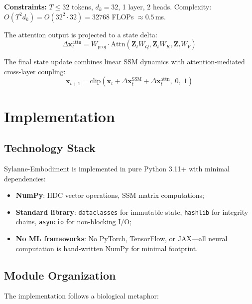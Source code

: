 \documentclass[10pt,twocolumn]{article}
\begin{document}
\textbf{Constraints:} $T \leq 32$ tokens, $d_k = 32$, 1 layer, 2 heads. Complexity: $O(T^2 d_k) = O(32^2 \cdot 32) = 32768$ FLOPs $\approx 0.5$\,ms.

The attention output is projected to a state delta:
\begin{equation}
\Delta \mathbf{x}_t^{\text{attn}} = W_{\text{proj}} \cdot \text{Attn}(\mathbf{Z}_t W_Q, \mathbf{Z}_t W_K, \mathbf{Z}_t W_V)
\end{equation}

The final state update combines linear SSM dynamics with attention-mediated cross-layer coupling:
\begin{equation}
\mathbf{x}_{t+1} = \text{clip}\left(\mathbf{x}_t + \Delta\mathbf{x}_t^{\text{SSM}} + \Delta\mathbf{x}_t^{\text{attn}},\; 0,\; 1\right)
\label{eq:final_update}
\end{equation}

\section{Implementation}
\label{sec:implementation}

\subsection{Technology Stack}

Sylanne-Embodiment is implemented in pure Python 3.11+ with minimal dependencies:

\begin{itemize}[nosep,leftmargin=*]
\item \textbf{NumPy}: HDC vector operations, SSM matrix computations;
\item \textbf{Standard library}: \texttt{dataclasses} for immutable state, \texttt{hashlib} for integrity chains, \texttt{asyncio} for non-blocking I/O;
\item \textbf{No ML frameworks}: No PyTorch, TensorFlow, or JAX---all neural computation is hand-written NumPy for minimal footprint.
\end{itemize}

\subsection{Module Organization}

The implementation follows a biological metaphor:
\end{document}
